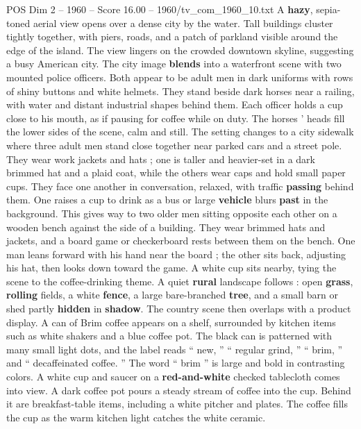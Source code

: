 \begin{textsample}{POS Dim 2 – 1960 – Score 16.00 – 1960/tv\_com\_1960\_10.txt}  \label{ex:f2_pos_014}
A \textbf{hazy}, sepia-toned aerial view opens over a dense city by the water.
Tall buildings cluster tightly together, with piers, roads, and a patch of parkland visible around the edge of the island.
The view lingers on the crowded downtown skyline, suggesting a busy American city.
The city image \textbf{blends} into a waterfront scene with two mounted police officers.
Both appear to be adult men in dark uniforms with rows of shiny buttons and white helmets.
They stand beside dark horses near a railing, with water and distant industrial shapes behind them.
Each officer holds a cup close to his mouth, as if pausing for coffee while on duty.
The horses ’ heads fill the lower sides of the scene, calm and still.
The setting changes to a city sidewalk where three adult men stand close together near parked cars and a street pole.
They wear work jackets and hats ; one is taller and heavier-set in a dark brimmed hat and a plaid coat, while the others wear caps and hold small paper cups.
They face one another in conversation, relaxed, with traffic \textbf{passing} behind them.
One raises a cup to drink as a bus or large \textbf{vehicle} blurs \textbf{past} in the background.
This gives way to two older men sitting opposite each other on a wooden bench against the side of a building.
They wear brimmed hats and jackets, and a board game or checkerboard rests between them on the bench.
One man leans forward with his hand near the board ; the other sits back, adjusting his hat, then looks down toward the game.
A white cup sits nearby, tying the scene to the coffee-drinking theme.
A quiet \textbf{rural} landscape follows : open \textbf{grass}, \textbf{rolling} fields, a white \textbf{fence}, a large bare-branched \textbf{tree}, and a small barn or shed partly \textbf{hidden} in \textbf{shadow}.
The country scene then overlaps with a product display.
A can of Brim coffee appears on a shelf, surrounded by kitchen items such as white shakers and a blue coffee pot.
The black can is patterned with many small light dots, and the label reads “ new, ” “ regular grind, ” “ brim, ” and “ decaffeinated coffee. ” The word “ brim ” is large and bold in contrasting colors.
A white cup and saucer on a \textbf{red-and-white} checked tablecloth comes into view.
A dark coffee pot pours a steady stream of coffee into the cup.
Behind it are breakfast-table items, including a white pitcher and plates.
The coffee fills the cup as the warm kitchen light catches the white ceramic.

\end{textsample}
